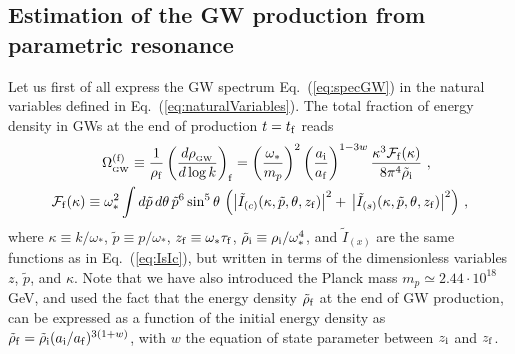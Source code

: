 \documentclass[a4paper,11pt]{article}
\begin{document}
\subsection{Estimation of the GW production from parametric resonance}

Let us first of all express the GW spectrum Eq.~(\ref{eq:specGW}) in the natural variables defined in Eq.~(\ref{eq:naturalVariables}). The total fraction of energy density in GWs at the end of production $t = t_{\rm f}$ reads
\begin{eqnarray}\label{eq:AmpProd}
\Omega_{_{\rm GW}}^{\rm (f)} \equiv {1\over \rho_{\rm f} }\left({d\rho_{_{\rm GW}}\over d\log k}\right)_{\rm f} = \left(\omega_{*}\over m_p\right)^2\left(a_{\rm i}\over a_{\rm f}\right)^{1-3w}{\kappa^3 \mathcal{F}_{\rm f}(\kappa)\over 8\pi^4 \tilde \rho_{\rm i}} \ ,
~~~~~~~~\\
\label{eq:AmpProd2}
\mathcal{F}_{\rm f}(\kappa) \equiv \omega_*^2\int d\tilde p\, d\theta\, {\tilde p}^{6}\sin^{5}\theta \,\left(\left|\tilde I_{(c)}(\kappa,\tilde p,\theta,z_{\rm f})\right|^{2} + \,\left|\tilde I_{(s)}(\kappa,\tilde p,\theta,z_{\rm f})\right|^{2}\right)\,,
\end{eqnarray}
where $\kappa \equiv k/\omega_{*}$, $\tilde p \equiv p/\omega_{*}$, $z_{\rm f} \equiv \omega_{*} \tau_{\rm f}$, $\tilde \rho_{\rm i} \equiv \rho_{\rm i}/\omega_{*}^4$, and $\tilde I_{(x)}$ are the same functions as in Eq.~(\ref{eq:IsIc}), but written in terms of the dimensionless variables $z$, $\tilde p$, and $\kappa$. Note that we have also introduced the Planck mass $m_p \simeq 2.44\cdot10^{18}$ GeV, and used the fact that the energy density $\tilde\rho_{\rm f}$ at the end of GW production, can be expressed as a function of the initial energy density as $\tilde \rho_{\rm f} = \tilde \rho_{\rm i} (a_{\rm i}/a_{\rm f})^{3(1+w)}$, with $w$ the equation of state parameter between $z_{\rm i}$ and $z_{\rm f}$. 
\end{document}
